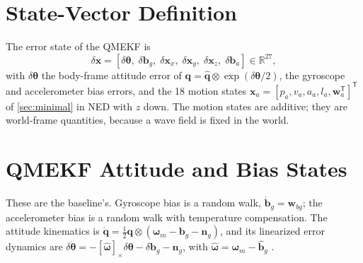 \documentclass[conference]{IEEEtran}
\DeclareRobustCommand{\vct}[1]{\bm{#1}}
\newcommand{\R}{\mathbb{R}}
\newcommand{\T}{^{\mathsf T}}
\theoremstyle{bodysmall}
\begin{document}
\section{State-Vector Definition}
The error state of the QMEKF is
\begin{equation}
\delta\vct x=[\delta\vct\theta,\;\delta\vct b_g,\;\delta\vct x_x,\;\delta\vct x_y,\;\delta\vct x_z,\;\delta\vct b_a]\in\R^{27},
\end{equation}
with $\delta\vct\theta$ the body-frame attitude error of
$\vct q=\hat{\vct q}\otimes\exp(\delta\vct\theta/2)$, the gyroscope and
accelerometer bias errors, and the 18 motion states
$\vct x_a=[p_a,v_a,a_a,l_a,\vct w_a\T]\T$ of \cref{sec:minimal} in NED with $z$ down. The
motion states are additive; they are world-frame quantities, because a wave
field is fixed in the world.

\section{QMEKF Attitude and Bias States}
These are the baseline's. Gyroscope bias is a random walk,
$\dot{\vct b}_g=\vct w_{bg}$; the accelerometer bias is a random walk with
temperature compensation. The attitude kinematics is
$\dot{\vct q}=\tfrac12\vct q\otimes(\vct\omega_m-\vct b_g-\vct n_g)$, and its
linearized error dynamics are
$\delta\dot{\vct\theta}=-[\hat{\vct\omega}]_\times\delta\vct\theta-\delta\vct b_g-\vct n_g$,
with $\hat{\vct\omega}=\vct\omega_m-\hat{\vct b}_g$ \cite{markley03}.
\end{document}
